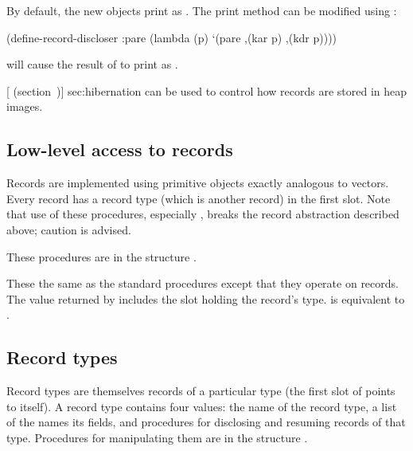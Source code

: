By default, the new objects print as .
The print method can be modified using :
\begin{example}
(define-record-discloser :pare
  (lambda (p) `(pare ,(kar p) ,(kdr p))))
\end{example}
 will cause the result of  to print as
 .

 [ (section~\Ref{})]
 {sec:hibernation}
 can be used to control how records are stored in heap images.

\subsection{Low-level access to records}

Records are implemented using primitive objects exactly analogous
 to vectors.
Every record has a record type (which is another record) in the first slot.
Note that use of these procedures, especially , breaks
 the record abstraction described above; caution is advised.

These procedures are in the structure .

\begin{protos}
\end{protos}
\noindent
These the same as the standard  procedures except that they
 operate on records.
The value returned by  includes the slot holding the
 record's type.
 is equivalent to .

\subsection{Record types}

Record types are themselves records of a particular type (the first slot
 of  points to itself).
A record type contains four values: the name of the record type, a list of
 the names its fields, and procedures for disclosing and resuming records
 of that type.
Procedures for manipulating them are in the structure .

